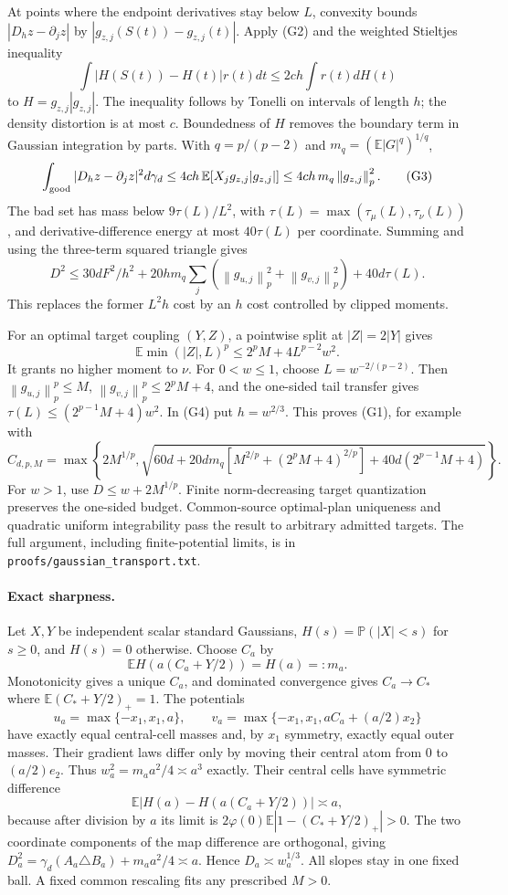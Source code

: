 \documentclass[11pt]{article}
\newcommand{\norm}[1]{\left\lVert#1\right\rVert}
\begin{document}
At points where the endpoint derivatives stay below $L$, convexity bounds $|D_hz-\partial_jz|$ by $|g_{z,j}(S(t))-g_{z,j}(t)|$. Apply (G2) and the weighted Stieltjes inequality
\[
\int|H(S(t))-H(t)|r(t)dt\le2ch\int r(t)dH(t)
\]
to $H=g_{z,j}|g_{z,j}|$. The inequality follows by Tonelli on intervals of length $h$; the density distortion is at most $c$. Boundedness of $H$ removes the boundary term in Gaussian integration by parts. With $q=p/(p-2)$ and $m_q=(\mathbb E|G|^q)^{1/q}$,
\[
\int_{\rm good}|D_hz-\partial_jz|^2d\gamma_d
\le4ch\,\mathbb E[X_jg_{z,j}|g_{z,j}|]
\le4ch\,m_q\norm{g_{z,j}}_p^2.
\tag{G3}
\]
The bad set has mass below $9\tau(L)/L^2$, with $\tau(L)=\max(\tau_\mu(L),\tau_\nu(L))$, and derivative-difference energy at most $40\tau(L)$ per coordinate. Summing and using the three-term squared triangle gives
\[
D^2\le30dF^2/h^2+
20h m_q\sum_j(\norm{g_{u,j}}_p^2+\norm{g_{v,j}}_p^2)
+40d\tau(L).
\tag{G4}
\]
This replaces the former $L^2h$ cost by an $h$ cost controlled by clipped moments.

For an optimal target coupling $(Y,Z)$, a pointwise split at $|Z|=2|Y|$ gives
\[
\mathbb E\min(|Z|,L)^p\le2^pM+4L^{p-2}w^2.
\tag{G5}
\]
It grants no higher moment to $\nu$. For $0<w\le1$, choose $L=w^{-2/(p-2)}$. Then $\norm{g_{u,j}}_p^p\le M$, $\norm{g_{v,j}}_p^p\le2^pM+4$, and the one-sided tail transfer gives $\tau(L)\le(2^{p-1}M+4)w^2$. In (G4) put $h=w^{2/3}$. This proves (G1), for example with
\[
C_{d,p,M}=\max\left\{2M^{1/p},
\sqrt{60d+20dm_q[M^{2/p}+(2^pM+4)^{2/p}]+40d(2^{p-1}M+4)}\right\}.
\]
For $w>1$, use $D\le w+2M^{1/p}$. Finite norm-decreasing target quantization preserves the one-sided budget. Common-source optimal-plan uniqueness and quadratic uniform integrability pass the result to arbitrary admitted targets. The full argument, including finite-potential limits, is in \texttt{proofs/gaussian\_transport.txt}.

\paragraph{Exact sharpness.}
Let $X,Y$ be independent scalar standard Gaussians, $H(s)=\mathbb P(|X|<s)$ for $s\ge0$, and $H(s)=0$ otherwise. Choose $C_a$ by
\[
\mathbb E H(a(C_a+Y/2))=H(a)=:m_a.
\]
Monotonicity gives a unique $C_a$, and dominated convergence gives $C_a\to C_*$ where $\mathbb E(C_*+Y/2)_+=1$. The potentials
\[
u_a=\max\{-x_1,x_1,a\},\qquad
v_a=\max\{-x_1,x_1,aC_a+(a/2)x_2\}
\]
have exactly equal central-cell masses and, by $x_1$ symmetry, exactly equal outer masses. Their gradient laws differ only by moving their central atom from $0$ to $(a/2)e_2$. Thus $w_a^2=m_a a^2/4\asymp a^3$ exactly. Their central cells have symmetric difference
\[
\mathbb E|H(a)-H(a(C_a+Y/2))|\asymp a,
\]
because after division by $a$ its limit is
$2\varphi(0)\mathbb E|1-(C_*+Y/2)_+|>0$.
The two coordinate components of the map difference are orthogonal, giving $D_a^2=\gamma_d(A_a\triangle B_a)+m_a a^2/4\asymp a$. Hence $D_a\asymp w_a^{1/3}$. All slopes stay in one fixed ball. A fixed common rescaling fits any prescribed $M>0$.
\end{document}
